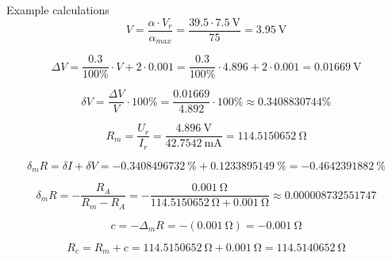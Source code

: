 Example calculations 
\begin{equation}
	 V = \frac{\alpha\cdot V_{r}}{\alpha_{max}} = \frac{39.5\cdot \SI{7.5}{\volt}}{75} = \SI{3.95}{\volt}
	 \label{eq:analog_V}
\end{equation}

\begin{equation}
	\Delta V = \frac{0.3}{100\unit{\percent}} \cdot V + 2 \cdot 0.001 = \frac{0.3}{100\unit{\percent}} \cdot 4.896 + 2 \cdot 0.001 = \SI{0.01669}{\volt}
\end{equation}

\begin{equation}
	  \delta V = \frac{\Delta V}{V}\cdot 100\unit{\percent} = \frac{0.01669}{4.892}\cdot 100\unit{\percent} \approx 0.3408830744\unit{\percent}
	  \label{eq:analog_delta_V}
\end{equation}

\begin{equation}
	R_m = \frac{U_r}{ I_r} = \frac{\SI{4.896}{\volt}} {\SI{42.7542}{\milli\ampere}} = \SI{114.5150652}{\ohm}
	\label{eq:analog_R_v}
\end{equation}

\begin{equation}
	\delta_m R = \delta I + \delta V = -\SI{0.3408496732}{\percent} + \SI{0.1233895149}{\percent} = -\SI{0.4642391882}{\percent}
	\label{eq:analog_Delta_m}
\end{equation}

\begin{equation}
	\delta_m R = -\frac{R_A}{R_m - R_A} = -\frac{\SI{0.001}{\ohm}}{\SI{114.5150652}{\ohm} + \SI{0.001}{\ohm}} \approx 0.000008732551747
\end{equation}

\begin{equation}
	c = -\Delta_m R = -(\SI{0.001}{\ohm}) = -\SI{0.001}{\ohm}
	\label{eq:analog_c}
\end{equation}

\begin{equation}
	R_c = R_m + c = \SI{114.5150652}{\ohm} + \SI{0.001}{\ohm} = \SI{114.5140652}{\ohm}
	\label{eq:analog_V_c}
\end{equation}


